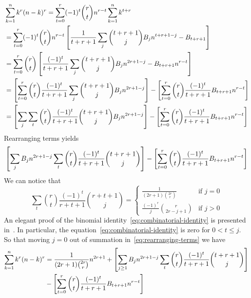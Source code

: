 \begin{align*}
    &\sum_{k=1}^{n} k^{r} (n-k)^{r}
    = \sum_{t=0}^{r} (-1)^t \binom{r}{t} n^{r-t} \sum_{k=1}^{n} k^{t+r} \\
    &= \sum_{t=0}^{r} (-1)^t \binom{r}{t} n^{r-t} \left[ \frac{1}{t+r+1} \sum_{j} \binom{t+r+1}{j} {B}\sb{j} n^{t+r+1-j} - {B}\sb{t+r+1} \right] \\
    &= \sum_{t=0}^{r} \binom{r}{t} \left[ \frac{(-1)^t}{t+r+1} \sum_{j} \binom{t+r+1}{j} {B}\sb{j} n^{2r+1-j} - {B}\sb{t+r+1} n^{r-t} \right] \\
    &= \left[ \sum_{t=0}^{r} \binom{r}{t} \frac{(-1)^t}{t+r+1} \sum_{j} \binom{t+r+1}{j} {B}\sb{j} n^{2r+1-j}  \right]
    - \left[ \sum_{t=0}^{r} \binom{r}{t} \frac{(-1)^t}{t+r+1} {B}\sb{t+r+1} n^{r-t} \right] \\
    &= \left[ \sum_{j} \sum_{t} \binom{r}{t} \frac{(-1)^t}{t+r+1} \binom{t+r+1}{j} {B}\sb{j} n^{2r+1-j}  \right]
    - \left[ \sum_{t=0}^{r} \binom{r}{t} \frac{(-1)^t}{t+r+1} {B}\sb{t+r+1} n^{r-t} \right]
\end{align*}
Rearranging terms yields
\begin{equation}
    \left[ \sum_{j} {B}\sb{j} n^{2r+1-j} \sum_{t} \binom{r}{t} \frac{(-1)^t}{t+r+1} \binom{t+r+1}{j}  \right]
    - \left[ \sum_{t=0}^{r} \binom{r}{t} \frac{(-1)^t}{t+r+1} {B}\sb{t+r+1} n^{r-t} \right]
    \label{eq:rearranging-terms}
\end{equation}
We can notice that
\begin{equation}
    \sum_{t} \binom{r}{t} \frac{(-1)^t}{r+t+1} \binom{r+t+1}{j}
    =\begin{cases}
         \frac{1}{(2r+1) \binom{2r}r} & \text{if } j=0\\
         \frac{(-1)^r}{j} \binom{r}{2r-j+1} & \text{if } j>0
    \end{cases}\label{eq:combinatorial-identity}
\end{equation}
An elegant proof of the binomial identity~\eqref{eq:combinatorial-identity} is presented in~\cite{scheuer2023mathstackexchange}.
In particular, the equation~\eqref{eq:combinatorial-identity} is zero for $0< t \leq j$.
So that moving $j=0$ out of summation in~\eqref{eq:rearranging-terms} we have
\begin{equation*}
    \begin{split}
        \sum_{k=1}^{n} k^{r} (n-k)^{r}
        &= \frac{1}{(2r+1) \binom{2r}r} n^{2r+1} + \left[ \sum_{j \geq 1} {B}\sb{j} n^{2r+1-j} \sum_{t} \binom{r}{t} \frac{(-1)^t}{t+r+1} \binom{t+r+1}{j} \right] \\
        &- \left[ \sum_{t=0}^{r} \binom{r}{t} \frac{(-1)^t}{t+r+1} {B}\sb{t+r+1} n^{r-t} \right]
    \end{split}
\end{equation*}
